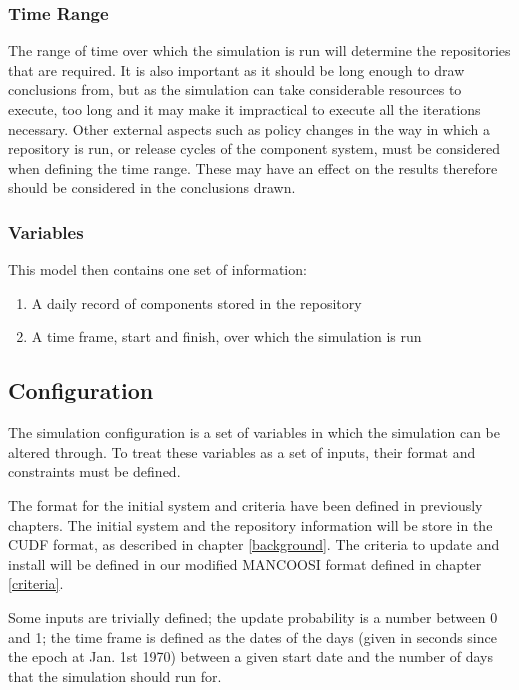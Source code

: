 \subsubsection{Time Range}
The range of time over which the simulation is run will determine the repositories that are required.
It is also important as it should be long enough to draw conclusions from,
but as the simulation can take considerable resources to execute, too long and it may make it impractical to execute all the iterations necessary.
Other external aspects such as policy changes in the way in which a repository is run, or release cycles of the component system, 
must be considered when defining the time range.
These may have an effect on the results therefore should be considered in the conclusions drawn.

\subsubsection{Variables}

This model then contains one set of information:
\begin{enumerate}
  \item A daily record of components stored in the repository
  \item A time frame, start and finish, over which the simulation is run
\end{enumerate}

\subsection{Configuration}
The simulation configuration is a set of variables in which the simulation can be altered through.
To treat these variables as a set of inputs, their format and constraints must be defined.

The format for the initial system and criteria have been defined in previously chapters.
The initial system and the repository information will be store in the CUDF format, as described in chapter \ref{background}. 
The criteria to update and install will be defined in our modified MANCOOSI format defined in chapter \ref{criteria}.

Some inputs are trivially defined;
the update probability is a number between 0 and 1;
the time frame is defined as the dates of the days (given in seconds since the epoch at Jan. 1st 1970) between a given start date and the number of days that the simulation should run for.

